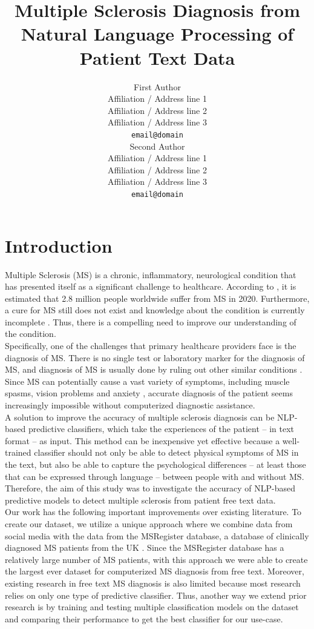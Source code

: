 \documentclass[11pt,a4paper]{article}
\title{Multiple Sclerosis Diagnosis from Natural Language Processing of Patient Text Data}
\author{First Author \\
  Affiliation / Address line 1 \\
  Affiliation / Address line 2 \\
  Affiliation / Address line 3 \\
  \texttt{email@domain} \\\And
  Second Author \\
  Affiliation / Address line 1 \\
  Affiliation / Address line 2 \\
  Affiliation / Address line 3 \\
  \texttt{email@domain} \\}
\date{}
\begin{document}
\maketitle
\begin{abstract}
\end{abstract}

\section{Introduction}
Multiple Sclerosis (MS) is a chronic, inflammatory, neurological condition that has presented itself as a significant challenge to healthcare. According to \citet{Walton:20}, it is estimated that 2.8 million people worldwide suffer from MS in 2020. Furthermore, a cure for MS still does not exist and knowledge about the condition is currently incomplete \citep{Bebo:22}. Thus, there is a compelling need to improve our understanding of the condition. \\
\indent Specifically, one of the challenges that primary healthcare providers face is the diagnosis of MS. There is no single test or laboratory marker for the diagnosis of MS, and diagnosis of MS is usually done by ruling out other similar conditions \citep{Omerhoca:18}. Since MS can potentially cause a vast variety of symptoms, including muscle spasms, vision problems and anxiety \citep{Ghasemi:17}, accurate diagnosis of the patient seems increasingly impossible without computerized diagnostic assistance. \\
\indent A solution to improve the accuracy of multiple sclerosis diagnosis can be NLP-based predictive classifiers, which take the experiences of the patient – in text format – as input. This method can be inexpensive yet effective because a well-trained classifier should not only be able to detect physical symptoms of MS in the text, but also be able to capture the psychological differences – at least those that can be expressed through language – between people with and without MS. Therefore, the aim of this study was to investigate the accuracy of NLP-based predictive models to detect multiple sclerosis from patient free text data. \\
\indent Our work has the following important improvements over existing literature. To create our dataset, we utilize a unique approach where we combine data from social media with the data from the MSRegister database, a database of clinically diagnosed MS patients from the UK \citep{Ford:12}. Since the MSRegister database has a relatively large number of MS patients, with this approach we were able to create the largest ever dataset for computerized MS diagnosis from free text. Moreover, existing research in free text MS diagnosis is also limited because most research relies on only one type of predictive classifier. Thus, another way we extend prior research is by training and testing multiple classification models on the dataset and comparing their performance to get the best classifier for our use-case. \\
\end{document}
